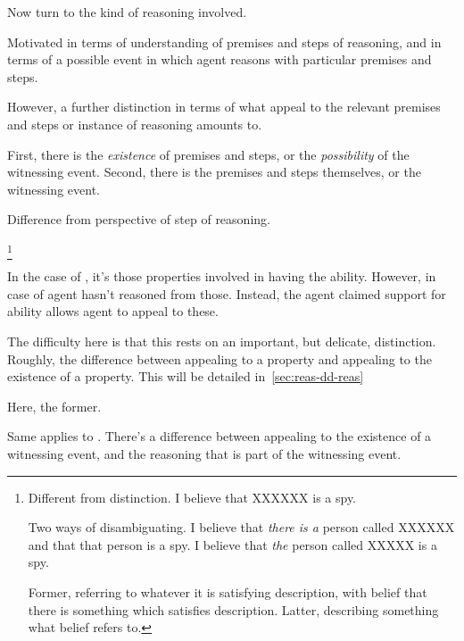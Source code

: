 \begin{note}
  Now turn to the kind of reasoning involved.

  Motivated \AR{} in terms of understanding of premises and steps of reasoning, and \WR{} in terms of a possible event in which agent reasons with particular premises and steps.

  However, a further distinction in terms of what appeal to the relevant premises and steps or instance of reasoning amounts to.

  First, there is the \emph{existence} of premises and steps, or the \emph{possibility} of the witnessing event.
  Second, there is the premises and steps themselves, or the witnessing event.

  Difference from perspective of step of reasoning.
  


  \footnote{
    Different from \dd{} \dr{} distinction.
    I believe that XXXXXX is a spy.

    Two ways of disambiguating.
    I believe that \emph{there is a} person called XXXXXX and that that person is a spy.
    I believe that \emph{the} person called XXXXX is a spy.

    Former, referring to whatever it is satisfying description, with belief that there is something which satisfies description.
    Latter, describing something what belief refers to.
  }
\end{note}


\begin{note}
  In the case of \AR{}, it's those properties involved in having the ability.
  However, in case of \EAS{} agent hasn't reasoned from those.
  Instead, the agent claimed support for ability allows agent to appeal to these.

  The difficulty here is that this rests on an important, but delicate, distinction.
  Roughly, the difference between appealing to a property and appealing to the existence of a property.
  This will be detailed in~\autoref{sec:reas-dd-reas}

  Here, the former.

  Same applies to \WR{}.
  There's a difference between appealing to the existence of a witnessing event, and the reasoning that is part of the witnessing event.
\end{note}

